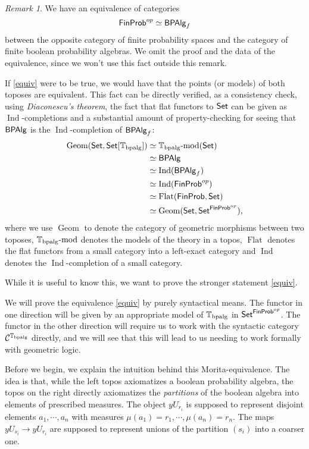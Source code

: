 \documentclass[a4paper]{amsproc}
\theoremstyle{plain}
\theoremstyle{definition}
\theoremstyle{remark}
\newtheorem{remark}[theorem]{Remark}
\numberwithin{equation}{section}
\newcommand{\y}{\textit{y}}
\DeclareMathOperator{\Geom}{Geom}
\DeclareMathOperator{\Ind}{Ind}
\DeclareMathOperator{\Flat}{Flat}
\newcommand{\Set}{\textup{\textsf{Set}}}
\newcommand{\FinProb}{\textup{\textsf{FinProb}}}
\newcommand{\BPAlg}{\textup{\textsf{BPAlg}}}
\begin{document}
\begin{remark}
    We have an equivalence of categories
    \[
        \FinProb^{op} \simeq \BPAlg_f
    \]
    between the opposite category of finite probability spaces and the category of finite boolean probability algebras. We omit the proof and the data of the equivalence, since we won't use this fact outside this remark.

    If \ref{equiv} were to be true, we would have that the points (or models) of both toposes are equivalent. This fact can be directly verified, as a consistency check, using \emph{Diaconescu's theorem}, the fact that flat functors to $\Set$ can be given as $\Ind$-completions and a substantial amount of property-checking for seeing that $\BPAlg$ is the $\Ind$-completion of $\BPAlg_f$:
    \begin{align*}
        \Geom(\Set,\Set[\mathbb{T}_{\textup{bpalg}}]) &\simeq \mathbb{T}_{\textup{bpalg}}\textup{-mod}(\Set) \\
        &\simeq \BPAlg \\
        &\simeq \Ind(\BPAlg_f) \\
        &\simeq \Ind(\FinProb^{op}) \\
        &\simeq \Flat(\FinProb, \Set) \\
        &\simeq \Geom(\Set, \Set^{\FinProb^{op}}) ,
    \end{align*}
    where we use $\Geom$ to denote the category of geometric morphisms between two toposes, $\mathbb{T}_{\textup{bpalg}}\textup{-mod}$ denotes the models of the theory in a topos, $\Flat$ denotes the flat functors from a small category into a left-exact category and $\Ind$ denotes the $\Ind$-completion of a small category.

    While it is useful to know this, we want to prove the stronger statement \ref{equiv}.
\end{remark}

We will prove the equivalence \ref{equiv} by purely syntactical means. The functor in one direction will be given by an appropriate model of $\mathbb{T}_{\textup{bpalg}}$ in $\Set^{\FinProb^{op}}$. The functor in the other direction will require us to work with the syntactic category $\mathcal{C}^{\mathbb{T}_{\textup{bpalg}}}$ directly, and we will see that this will lead to us needing to work formally with geometric logic.

Before we begin, we explain the intuition behind this Morita-equivalence. The idea is that, while the left topos axiomatizes a boolean probability algebra, the topos on the right directly axiomatizes the \emph{partitions} of the boolean algebra into elements of prescribed measures. The object $\y U_{r_i}$ is supposed to represent disjoint elements $a_1,\cdots,a_n$ with measures $\mu(a_1) = r_1,\cdots,\mu(a_n) = r_n$. The maps $\y U_{s_i} \to \y U_{r_i}$ are supposed to represent unions of the partition $(s_i)$ into a coarser one.
\end{document}

